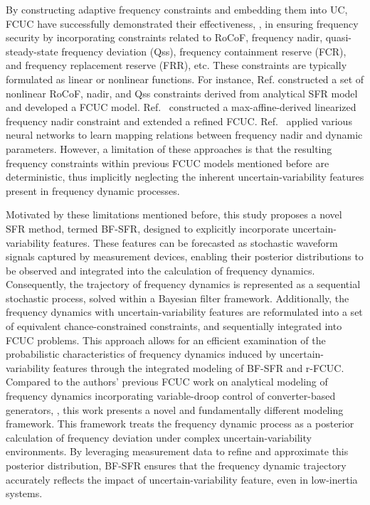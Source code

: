 \documentclass[lettersize,journal]{IEEEtran}
\begin{document}
By constructing adaptive frequency constraints and embedding them into UC, FCUC have successfully demonstrated their effectiveness, \cite{10098683,6269098,9765359,restrepo2005unit,zhang2020modeling,brito2018unit,6269098,7822944,9964327,liu2019model,10384867,wei2025data,10820061}, in ensuring frequency security by incorporating constraints related to RoCoF, frequency nadir, quasi-steady-state frequency deviation (Qss), frequency containment reserve (FCR), and frequency replacement reserve (FRR), etc. These constraints are typically formulated as linear or nonlinear functions. For instance, Ref.\cite{oskouee2021primary,mahmoudnia2024enhancing} constructed a set of nonlinear RoCoF, nadir, and Qss constraints derived from analytical SFR model and developed a FCUC model. Ref.~\cite{paturet2020stochastic,9765359} constructed a max-affine-derived linearized frequency nadir constraint and extended a refined FCUC. Ref.~\cite{10098683,7822944,9964327,liu2019model,10384867,wei2025data,10820061} applied various neural networks to learn mapping relations between frequency nadir and dynamic parameters. However, a limitation of these approaches is that the resulting frequency constraints within previous FCUC models mentioned before are deterministic, thus implicitly neglecting the inherent uncertain-variability features present in frequency dynamic processes.

Motivated by these limitations mentioned before, this study proposes a novel SFR method, termed BF-SFR, designed to explicitly incorporate uncertain-variability features. These features can be forecasted as stochastic waveform signals captured by measurement devices, enabling their posterior distributions to be observed and integrated into the calculation of frequency dynamics. Consequently, the trajectory of frequency dynamics is represented as a sequential stochastic process, solved within a Bayesian filter framework. Additionally, the frequency dynamics with uncertain-variability features are reformulated into a set of equivalent chance-constrained constraints, and sequentially integrated into FCUC problems. This approach allows for an efficient examination of the probabilistic characteristics of frequency dynamics induced by uncertain-variability features through the integrated modeling of BF-SFR and r-FCUC. Compared to the authors' previous FCUC work on analytical modeling of frequency dynamics incorporating variable-droop control of converter-based generators, \cite{9765359}, this work presents a novel and fundamentally different modeling framework. This framework treats the frequency dynamic process as a posterior calculation of frequency deviation under complex uncertain-variability environments. By leveraging measurement data to refine and approximate this posterior distribution, BF-SFR ensures that the frequency dynamic trajectory accurately reflects the impact of uncertain-variability feature, even in low-inertia systems.
\end{document}
